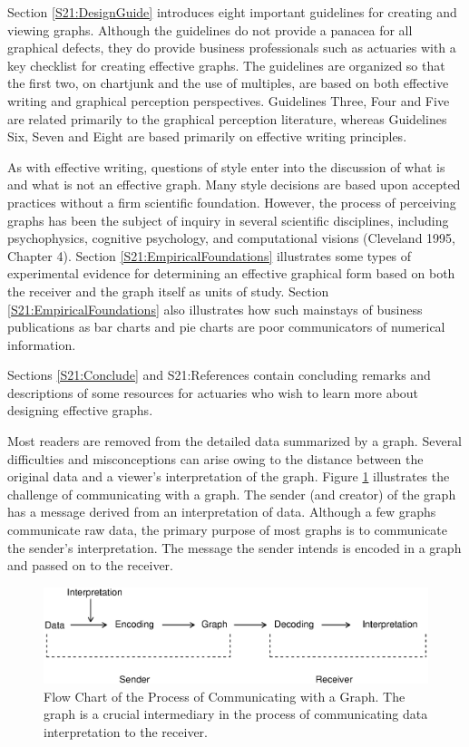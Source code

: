 Section \ref{S21:DesignGuide} introduces eight important guidelines
for creating and viewing graphs. Although the guidelines do not
provide a panacea for all graphical defects, they do provide
business professionals such as actuaries with a key checklist for
creating effective graphs. The guidelines are organized so that the
first two, on chartjunk and the use of multiples, are based on both
effective writing and graphical perception perspectives. Guidelines
Three, Four and Five are related primarily to the graphical
perception literature, whereas Guidelines Six, Seven and Eight are
based primarily on effective writing principles.

As with effective writing, questions of style enter into the
discussion of what is and what is not an effective graph. Many style
decisions are based upon accepted practices without a firm
scientific foundation. However, the process of perceiving graphs has
been the subject of inquiry in several scientific disciplines,
including psychophysics, cognitive psychology, and computational
visions (Cleveland 1995, Chapter 4). Section
\ref{S21:EmpiricalFoundations} illustrates some types of
experimental evidence for determining an effective graphical form
based on both the receiver and the graph itself as units of study.
Section \ref{S21:EmpiricalFoundations} also illustrates how such
mainstays of business publications as bar charts and pie charts are
poor communicators of numerical information.

Sections \ref{S21:Conclude} and {S21:References} contain concluding
remarks and descriptions of some resources for actuaries who wish to
learn more about designing effective graphs.

Most readers are removed from the detailed data summarized by a
graph. Several difficulties and misconceptions can arise owing to
the distance between the original data and a viewer's interpretation
of the graph. Figure \ref{F21:Flowchart} illustrates the challenge
of communicating with a graph. The sender (and creator) of the graph
has a message derived from an interpretation of data. Although a few
graphs communicate raw data, the primary purpose of most graphs is
to communicate the sender's interpretation. The message the sender
intends is encoded in a graph and passed on to the receiver.

\begin{figure}[htp]
  \begin{center}
    \includegraphics[width=.8\textwidth]
        {Chapter21Graphs/Fig21_1FlowChart.eps}
    \caption{\label{F21:Flowchart} \small Flow Chart of the Process of
Communicating with a Graph. The graph is a crucial intermediary in
the process of communicating data interpretation to the receiver.}
  \end{center}
\end{figure}

